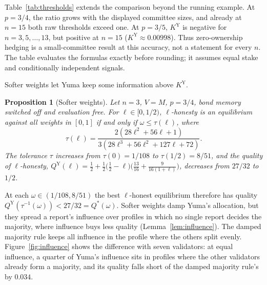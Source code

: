 \documentclass[sigconf,anonymous,review]{acmart}
\numberwithin{equation}{section}
\newtheorem{proposition}[theorem]{Proposition}
\newcommand{\KY}{K^{\mathrm{Y}}}
\newcommand{\QY}{Q^{\mathrm{Y}}}
\begin{document}
\begin{table}[t]
\caption{Raw threshold ratios $\KY/K$ from the closed forms, with $V=M$,
free evaluation and bond memory off. Negative values mean that a small
hedge pays at zero ownership. A dagger marks $K,\KY\ge1$: both then support
fully decisive reports throughout the feasible ownership range $[0,1]$.}
\label{tab:thresholds}
\centering
\small

\end{table}

Table~\ref{tab:thresholds} extends the comparison beyond the running example.
At $p=3/4$, the ratio grows with the displayed committee sizes, and already
at $n=15$ both raw thresholds exceed one. At $p=3/5$, $\KY$ is negative
for $n=3,5,\ldots,13$, but positive at $n=15$ ($\KY\approx0.00998$).
Thus zero-ownership hedging is a small-committee result at this accuracy,
not a statement for every $n$. The table evaluates the formulas exactly
before rounding; it assumes equal stake and conditionally independent signals.

Softer weights let Yuma keep some information above $\KY$.

\begin{proposition}[Softer weights]\label{prop:soft}
Let $n=3$, $V=M$, $p=3/4$, bond memory switched off and evaluation free. For
$\ell\in[0,1/2)$, $\ell$-honesty is an equilibrium against all weights in
$[0,1]$ if and only if $\omega\le\tau(\ell)$, where
\[
\tau(\ell)=\frac{2(28\ell^2+56\ell+1)}{3(28\ell^3+56\ell^2+127\ell+72)} .
\]
The tolerance $\tau$ increases from $\tau(0)=1/108$ to $\tau(1/2)=8/51$, and the
quality of $\ell$-honesty,
$\QY(\ell)=\frac12+\frac12\bigl(\frac12-\ell\bigr)\bigl(\frac{13}{16}+\frac{9}{16(1+\ell)}\bigr)$,
decreases from $27/32$ to $1/2$.
\end{proposition}

At each $\omega\in(1/108,8/51)$ the best $\ell$-honest equilibrium therefore has
quality $\QY(\tau^{-1}(\omega))<27/32=Q^*(\omega)$. Softer weights damp Yuma's
allocation, but they spread a report's influence over profiles in which no
single report decides the majority, where influence buys less quality
(Lemma~\ref{lem:influence}). The damped majority rule keeps all influence in the
profile where the others split evenly. Figure~\ref{fig:influence} shows the
difference with seven validators: at equal influence, a quarter of Yuma's
influence sits in profiles where the other validators already form a majority,
and its quality falls short of the damped majority rule's by $0.034$.
\end{document}
